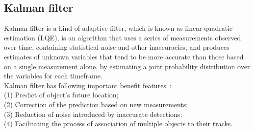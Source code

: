 \documentclass[10pt,twocolumn,letterpaper]{article}
\begin{document}
\subsection{Kalman filter}

Kalman filter is a kind of adaptive filter, which is known as linear quadratic estimation (LQE), is an algorithm that uses a series of measurements observed over time, containing statistical noise and other inaccuracies, and produces estimates of unknown variables that tend to be more accurate than those based on a single measurement alone, by estimating a joint probability distribution over the variables for each timeframe.\\
Kalman filter has following important benefit features~\cite{Kalman}:\\
(1) Predict of object's future location;\\
(2) Correction of the prediction based on new measurements;\\
(3) Reduction of noise introduced by inaccurate detections;\\
(4) Facilitating the process of association of multiple objects to their tracks.

\end{document}
